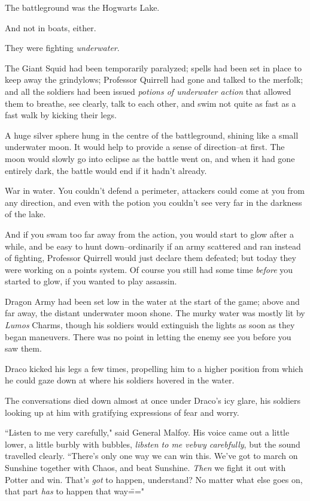 The battleground was the Hogwarts Lake.

And not in boats, either.

They were fighting \emph{underwater}.

The Giant Squid had been temporarily paralyzed; spells had been set in place to keep away the grindylows; Professor Quirrell had gone and talked to the merfolk; and all the soldiers had been issued \emph{potions of underwater action} that allowed them to breathe, see clearly, talk to each other, and swim not quite as fast as a fast walk by kicking their legs.

A huge silver sphere hung in the centre of the battleground, shining like a small underwater moon. It would help to provide a sense of direction\---at first. The moon would slowly go into eclipse as the battle went on, and when it had gone entirely dark, the battle would end if it hadn't already.

War in water. You couldn't defend a perimeter, attackers could come at you from any direction, and even with the potion you couldn't see very far in the darkness of the lake.

And if you swam too far away from the action, you would start to glow after a while, and be easy to hunt down\---ordinarily if an army scattered and ran instead of fighting, Professor Quirrell would just declare them defeated; but today they were working on a points system. Of course you still had some time \emph{before} you started to glow, if you wanted to play assassin.

Dragon Army had been set low in the water at the start of the game; above and far away, the distant underwater moon shone. The murky water was mostly lit by \emph{Lumos} Charms, though his soldiers would extinguish the lights as soon as they began maneuvers. There was no point in letting the enemy see you before you saw them.

Draco kicked his legs a few times, propelling him to a higher position from which he could gaze down at where his soldiers hovered in the water.

The conversations died down almost at once under Draco's icy glare, his soldiers looking up at him with gratifying expressions of fear and worry.

``Listen to me very carefully," said General Malfoy. His voice came out a little lower, a little burbly with bubbles, \emph{libsten to me vebwy carebfully}, but the sound travelled clearly. ``There's only one way we can win this. We've got to march on Sunshine together with Chaos, and beat Sunshine. \emph{Then} we fight it out with Potter and win. That's \emph{got} to happen, understand? No matter what else goes on, that part \emph{has} to happen that way\==="

